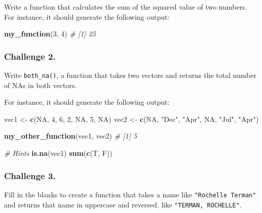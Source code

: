 \documentclass[
]{book}
\newenvironment{Shaded}{\begin{snugshade}}{\end{snugshade}}
\newcommand{\CommentTok}[1]{\textcolor[rgb]{0.56,0.35,0.01}{\textit{#1}}}
\newcommand{\DecValTok}[1]{\textcolor[rgb]{0.00,0.00,0.81}{#1}}
\newcommand{\KeywordTok}[1]{\textcolor[rgb]{0.13,0.29,0.53}{\textbf{#1}}}
\newcommand{\NormalTok}[1]{#1}
\newcommand{\OtherTok}[1]{\textcolor[rgb]{0.56,0.35,0.01}{#1}}
\newcommand{\StringTok}[1]{\textcolor[rgb]{0.31,0.60,0.02}{#1}}
\begin{document}
Write a function that calculates the sum of the squared value of two numbers. For instance, it should generate the following output:

\begin{Shaded}
\begin{Highlighting}[]
\KeywordTok{my_function}\NormalTok{(}\DecValTok{3}\NormalTok{, }\DecValTok{4}\NormalTok{)}
\CommentTok{# [1] 25}
\end{Highlighting}
\end{Shaded}

\hypertarget{challenge-2.-13}{%
\subsubsection*{Challenge 2.}\label{challenge-2.-13}}

Write \texttt{both\_na()}, a function that takes two vectors and returns the total number of NAs in both vectors.

For instance, it should generate the following output:

\begin{Shaded}
\begin{Highlighting}[]
\NormalTok{vec1 <-}\StringTok{ }\KeywordTok{c}\NormalTok{(}\OtherTok{NA}\NormalTok{, }\DecValTok{4}\NormalTok{, }\DecValTok{6}\NormalTok{, }\DecValTok{2}\NormalTok{, }\OtherTok{NA}\NormalTok{, }\DecValTok{5}\NormalTok{, }\OtherTok{NA}\NormalTok{)}
\NormalTok{vec2 <-}\StringTok{ }\KeywordTok{c}\NormalTok{(}\OtherTok{NA}\NormalTok{, }\StringTok{"Dec"}\NormalTok{, }\StringTok{"Apr"}\NormalTok{, }\OtherTok{NA}\NormalTok{, }\StringTok{"Jul"}\NormalTok{, }\StringTok{"Apr"}\NormalTok{)}

\KeywordTok{my_other_function}\NormalTok{(vec1, vec2)}
\CommentTok{# [1] 5}

\CommentTok{# Hints}
\KeywordTok{is.na}\NormalTok{(vec1)}
\KeywordTok{sum}\NormalTok{(}\KeywordTok{c}\NormalTok{(T, F))}
\end{Highlighting}
\end{Shaded}

\hypertarget{challenge-3.-9}{%
\subsubsection*{Challenge 3.}\label{challenge-3.-9}}

Fill in the blanks to create a function that takes a name like \texttt{"Rochelle\ Terman"} and returns that name in uppercase and reversed, like \texttt{"TERMAN,\ ROCHELLE"}.
\end{document}
